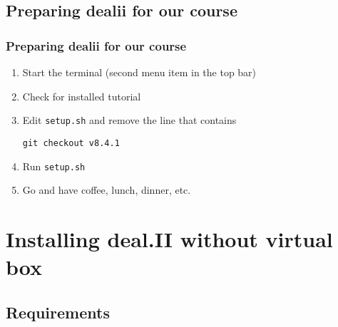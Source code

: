 \subsection{Preparing dealii for our course}
\begin{frame}
  \frametitle{Preparing dealii for our course}
  \begin{enumerate}
  \item Start the terminal (second menu item in the top bar)
  \item Check for installed tutorial
    \begin{block}{}
            
    \end{block}
  \item Edit \lstinline!setup.sh! and remove the line that contains
    \begin{block}{}
      \lstinline!git checkout v8.4.1!
    \end{block}
    \item Run \lstinline!setup.sh! 
  \item Go and have coffee, lunch, dinner, etc.
  \end{enumerate}
\end{frame}

%       

\section[Installing]{Installing deal.II without virtual box}
\subsection{Requirements}


